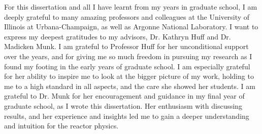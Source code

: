 For this dissertation and all I have learnt from my years in graduate school, 
I am deeply grateful to many amazing professors and colleagues at the University of 
Illinois at Urbana-Champaign, as well as Argonne National Laboratory. 
I want to express my deepest gratitudes to my advisors, Dr. Kathryn Huff and Dr. 
Madicken Munk. 
I am grateful to Professor Huff for her unconditional support over the years, and for 
giving me so much freedom in pursuing my research as I found my footing in the early 
years of graduate school. 
I am especially grateful for her ability to inspire me to look at the bigger picture of 
my work, holding to me to a high standard in all aspects, and the care she showed 
her students. 
I am grateful to Dr. Munk for her encouragement and guidance in my final year 
of graduate school, as I wrote this dissertation. 
Her enthusiasm with discussing results, and her experience and insights led me to 
gain a deeper understanding and intuition for the reactor physics.  









